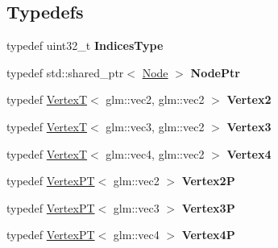 \subsection*{\-Typedefs}
\begin{DoxyCompactItemize}
\item 
\hypertarget{namespaces9_a1a4285937536b279241df77bf0280883}{typedef uint32\-\_\-t {\bfseries \-Indices\-Type}}\label{namespaces9_a1a4285937536b279241df77bf0280883}

\item 
\hypertarget{namespaces9_a96e9f2735d87d7a7695edbf2dab2eec5}{typedef std\-::shared\-\_\-ptr$<$ \hyperlink{classs9_1_1Node}{\-Node} $>$ {\bfseries \-Node\-Ptr}}\label{namespaces9_a96e9f2735d87d7a7695edbf2dab2eec5}

\item 
\hypertarget{namespaces9_a92ead42bcd1533932fe88ad2bee13e69}{typedef \hyperlink{structs9_1_1VertexT}{\-Vertex\-T}$<$ glm\-::vec2, \*
glm\-::vec2 $>$ {\bfseries \-Vertex2}}\label{namespaces9_a92ead42bcd1533932fe88ad2bee13e69}

\item 
\hypertarget{namespaces9_ac01a104c4bb68376b72b325cc7e74a56}{typedef \hyperlink{structs9_1_1VertexT}{\-Vertex\-T}$<$ glm\-::vec3, \*
glm\-::vec2 $>$ {\bfseries \-Vertex3}}\label{namespaces9_ac01a104c4bb68376b72b325cc7e74a56}

\item 
\hypertarget{namespaces9_ad533b413e437b87b03e117165cb1fc26}{typedef \hyperlink{structs9_1_1VertexT}{\-Vertex\-T}$<$ glm\-::vec4, \*
glm\-::vec2 $>$ {\bfseries \-Vertex4}}\label{namespaces9_ad533b413e437b87b03e117165cb1fc26}

\item 
\hypertarget{namespaces9_ab06db9240c7a88660643ec1fee659275}{typedef \hyperlink{structs9_1_1VertexPT}{\-Vertex\-P\-T}$<$ glm\-::vec2 $>$ {\bfseries \-Vertex2\-P}}\label{namespaces9_ab06db9240c7a88660643ec1fee659275}

\item 
\hypertarget{namespaces9_a665382c44c782ae380543be532857b68}{typedef \hyperlink{structs9_1_1VertexPT}{\-Vertex\-P\-T}$<$ glm\-::vec3 $>$ {\bfseries \-Vertex3\-P}}\label{namespaces9_a665382c44c782ae380543be532857b68}

\item 
\hypertarget{namespaces9_a39f5546e9e5eadc1abf8b53896e0a7f6}{typedef \hyperlink{structs9_1_1VertexPT}{\-Vertex\-P\-T}$<$ glm\-::vec4 $>$ {\bfseries \-Vertex4\-P}}\label{namespaces9_a39f5546e9e5eadc1abf8b53896e0a7f6}


\end{DoxyCompactItemize}
